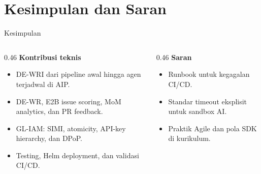 \section{Kesimpulan dan Saran}
\begin{contentframe}{Kesimpulan}
    \begin{columns}[T,onlytextwidth]
        \begin{column}{0.46\textwidth}
            \textbf{Kontribusi teknis}\par
            \begin{itemize}\setlength{\itemsep}{3pt}
                \item DE-WRI dari pipeline awal hingga agen terjadwal di AIP.
                \item DE-WR, E2B issue scoring, MoM analytics, dan PR feedback.
                \item GL-IAM: SIMI, atomicity, API-key hierarchy, dan DPoP.
                \item Testing, Helm deployment, dan validasi CI/CD.
            \end{itemize}
        \end{column}
        \begin{column}{0.46\textwidth}
            \textbf{Saran}\par
            \begin{itemize}\setlength{\itemsep}{3pt}
                \item Runbook untuk kegagalan CI/CD.
                \item Standar timeout eksplisit untuk sandbox AI.
                \item Praktik Agile dan pola SDK di kurikulum.
            \end{itemize}
        \end{column}
    \end{columns}
\end{contentframe}



